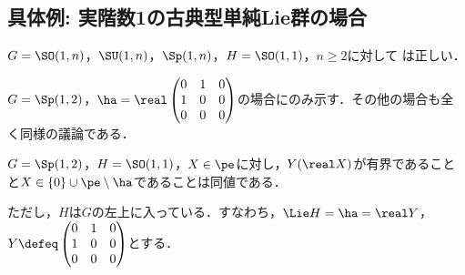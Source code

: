 \subsection{具体例: 実階数1の古典型単純Lie群の場合}
\begin{prop}\label{prop:classical-rank-one}
  $G = \SO(1,n)$，$ \SU(1, n)$，$\Sp(1,n) $，$H = \SO(1,1) $，$n\geq 2$に対して は正しい．
\end{prop}

$G = \Sp(1,2) $，$\ha = \real \begin{pmatrix}
    0 & 1 & 0 \\
    1 & 0 & 0\\
    0 & 0 & 0
  \end{pmatrix}$の場合にのみ示す．その他の場合も全く同様の議論である．
\begin{prop}\label{prop:1127-main}
  $G = \Sp(1,2) $，$H = \SO(1,1)$，$X\in \pe$に対し，$Y(\real X) $が有界であることと$ X\in \{0\}\cup \pe\setminus \ha  $であることは同値である．
\end{prop}

ただし，$H$は$G$の左上に入っている．すなわち，$\Lie H = \ha = \real Y $，$Y\defeq \begin{pmatrix}
  0 & 1 & 0 \\
  1 & 0 & 0\\
  0 & 0 & 0
\end{pmatrix}$とする．

